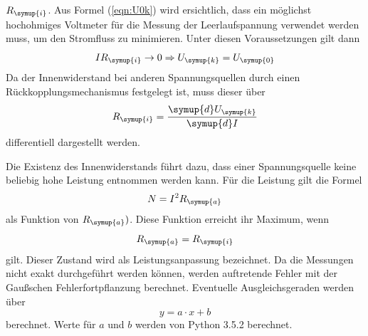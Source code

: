 $R_\symup{i}$.
Aus Formel (\ref{eqn:U0k}) wird ersichtlich, dass ein möglichst hochohmiges
Voltmeter für die Messung der Leerlaufspannung verwendet werden muss, um den
Stromfluss zu minimieren. Unter diesen Voraussetzungen gilt dann
\begin{equation*}
  I R_\symup{i} \rightarrow 0 \Rightarrow U_\symup{k} = U_\symup{0}
\end{equation*}
Da der Innenwiderstand bei anderen Spannungsquellen durch einen
Rückkopplungsmechanismus festgelegt ist, muss dieser über
\begin{equation}
  R_\symup{i}=\frac{\symup{d}U_\symup{k}}{\symup{d}I}
\end{equation}
differentiell dargestellt werden.

Die Existenz des Innenwiderstands führt dazu, dass einer Spannungsquelle keine
beliebig hohe Leistung entnommen werden kann. Für die Leistung gilt die Formel
\begin{equation}
  N=I^2R_\symup{a}
\end{equation}
als Funktion von $R_\symup{a})$. Diese Funktion erreicht ihr Maximum, wenn
\begin{equation*}
  R_\symup{a} = R_\symup{i}
\end{equation*}
gilt. Dieser Zustand wird als Leistungsanpassung bezeichnet.
Da die Messungen nicht exakt durchgeführt werden können, werden auftretende
Fehler mit der Gaußschen Fehlerfortpflanzung berechnet.
Eventuelle Ausgleichsgeraden werden über
\begin{equation}
  y = a \cdot x + b
\end{equation}
berechnet. Werte für $a$ und $b$ werden von Python 3.5.2 berechnet.
